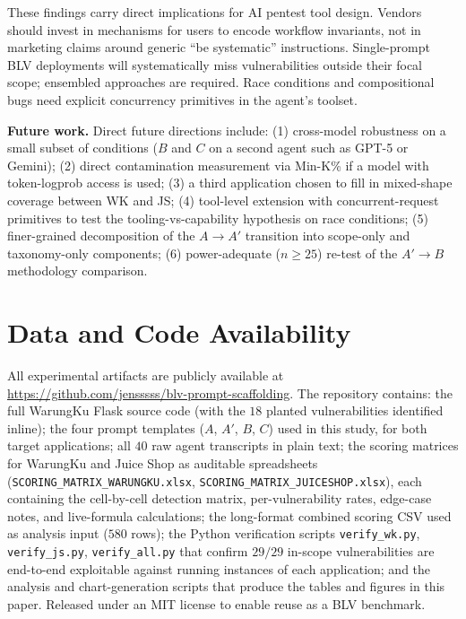 \documentclass[conference]{IEEEtran}
\begin{document}
These findings carry direct implications for AI pentest tool design. Vendors should invest in mechanisms for users to encode workflow invariants, not in marketing claims around generic ``be systematic'' instructions. Single-prompt BLV deployments will systematically miss vulnerabilities outside their focal scope; ensembled approaches are required. Race conditions and compositional bugs need explicit concurrency primitives in the agent's toolset.

\textbf{Future work.} Direct future directions include: (1) cross-model robustness on a small subset of conditions ($B$ and $C$ on a second agent such as GPT-5 or Gemini); (2) direct contamination measurement via Min-K\% if a model with token-logprob access is used; (3) a third application chosen to fill in mixed-shape coverage between WK and JS; (4) tool-level extension with concurrent-request primitives to test the tooling-vs-capability hypothesis on race conditions; (5) finer-grained decomposition of the $A \to A'$ transition into scope-only and taxonomy-only components; (6) power-adequate ($n \ge 25$) re-test of the $A' \to B$ methodology comparison.

\section*{Data and Code Availability}
\label{sec:availability}

All experimental artifacts are publicly available at \url{https://github.com/jensssss/blv-prompt-scaffolding}. The repository contains: the full WarungKu Flask source code (with the $18$ planted vulnerabilities identified inline); the four prompt templates ($A$, $A'$, $B$, $C$) used in this study, for both target applications; all $40$ raw agent transcripts in plain text; the scoring matrices for WarungKu and Juice Shop as auditable spreadsheets (\texttt{SCORING\_MATRIX\_WARUNGKU.xlsx}, \texttt{SCORING\_MATRIX\_JUICESHOP.xlsx}), each containing the cell-by-cell detection matrix, per-vulnerability rates, edge-case notes, and live-formula calculations; the long-format combined scoring CSV used as analysis input ($580$ rows); the Python verification scripts \texttt{verify\_wk.py}, \texttt{verify\_js.py}, \texttt{verify\_all.py} that confirm $29/29$ in-scope vulnerabilities are end-to-end exploitable against running instances of each application; and the analysis and chart-generation scripts that produce the tables and figures in this paper. Released under an MIT license to enable reuse as a BLV benchmark.
\end{document}
